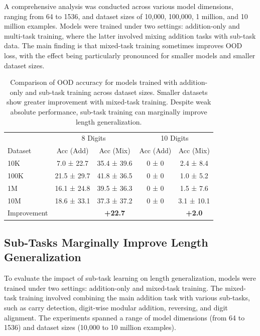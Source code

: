 A comprehensive analysis was conducted across various model dimensions, ranging from 64 to 1536, and dataset sizes of 10,000, 100,000, 1 million, and 10 million examples. Models were trained under two settings: addition-only and multi-task training, where the latter involved mixing addition tasks with sub-task data. The main finding is that mixed-task training sometimes improves OOD loss, with the effect being particularly pronounced for smaller models and smaller dataset sizes.

\begin{table}[h!]
    \centering
    \caption{Comparison of OOD accuracy for models trained with addition-only and sub-task training across dataset sizes. Smaller datasets show greater improvement with mixed-task training. Despite weak absolute performance, sub-task training can marginally improve length generalization.}
    \label{tab:subtask_results}
    \begin{tabular}{lcccc}
                    & \multicolumn{2}{c}{8 Digits} & \multicolumn{2}{c}{10 Digits}                             \\
        Dataset     & Acc (Add)                    & Acc (Mix)                     & Acc (Add) & Acc (Mix)     \\
        \midrule
        10K         & 7.0 ± 22.7                   & 35.4 ± 39.6                   & 0 ± 0     & 2.4 ± 8.4     \\
        100K        & 21.5 ± 29.7                  & 41.8 ± 36.5                   & 0 ± 0     & 1.0 ± 5.2     \\
        1M          & 16.1 ± 24.8                  & 39.5 ± 36.3                   & 0 ± 0     & 1.5 ± 7.6     \\
        10M         & 18.6 ± 33.1                  & 37.3 ± 37.2                   & 0 ± 0     & 3.1 ± 10.1    \\
        \midrule
        Improvement &                              & \textbf{+22.7}                &           & \textbf{+2.0} \\
        \bottomrule
    \end{tabular}
\end{table}

\subsection{Sub-Tasks Marginally Improve Length Generalization}

To evaluate the impact of sub-task learning on length generalization, models were trained under two settings: addition-only and mixed-task training. The mixed-task training involved combining the main addition task with various sub-tasks, such as carry detection, digit-wise modular addition, reversing, and digit alignment. The experiments spanned a range of model dimensions (from 64 to 1536) and dataset sizes (10,000 to 10 million examples).

